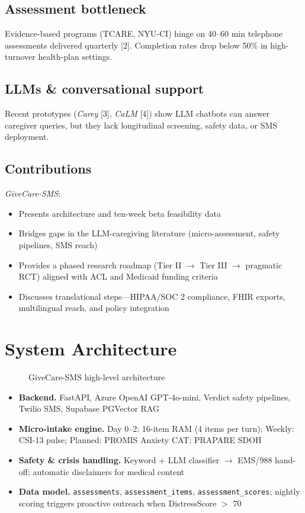 \documentclass[12pt]{article}
\begin{document}
\subsection{Assessment bottleneck}
Evidence-based programs (TCARE, NYU-CI) hinge on 40--60 min telephone assessments delivered quarterly [2]. Completion rates drop below 50\% in high-turnover health-plan settings.

\subsection{LLMs \& conversational support}
Recent prototypes (\emph{Carey} [3], \emph{CaLM} [4]) show LLM chatbots can answer caregiver queries, but they lack longitudinal screening, safety data, or SMS deployment.

\subsection{Contributions}
\emph{GiveCare-SMS}:
\begin{itemize}
\item Presents architecture and ten-week beta feasibility data
\item Bridges gaps in the LLM-caregiving literature (micro-assessment, safety pipelines, SMS reach)
\item Provides a phased research roadmap (Tier II $\rightarrow$ Tier III $\rightarrow$ pragmatic RCT) aligned with ACL and Medicaid funding criteria
\item Discusses translational steps---HIPAA/SOC 2 compliance, FHIR exports, multilingual reach, and policy integration
\end{itemize}

\section{System Architecture}

\begin{figure}[htbp]
\centering
{}
\caption{GiveCare-SMS high-level architecture}
\end{figure}

\begin{itemize}
\item \textbf{Backend.} FastAPI, Azure OpenAI GPT-4o-mini, Verdict safety pipelines, Twilio SMS, Supabase PGVector RAG
\item \textbf{Micro-intake engine.} Day 0--2: 16-item RAM (4 items per turn); Weekly: CSI-13 pulse; Planned: PROMIS Anxiety CAT; PRAPARE SDOH
\item \textbf{Safety \& crisis handling.} Keyword + LLM classifier $\rightarrow$ EMS/988 hand-off; automatic disclaimers for medical content
\item \textbf{Data model.} \texttt{assessments}, \texttt{assessment\_items}, \texttt{assessment\_scores}; nightly scoring triggers proactive outreach when DistressScore $>$ 70
\end{itemize}
\end{document}
